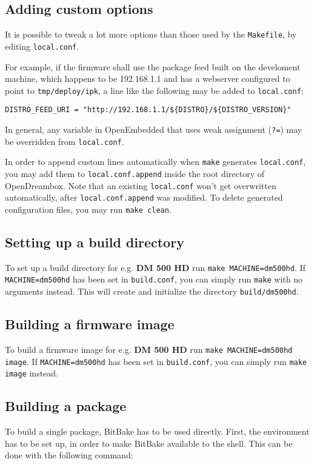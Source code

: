 \documentclass[a4paper]{article}
\newcommand{\shell}[1]{\texttt{\small #1}}
\begin{document}
  \subsection{Adding custom options}
     It is possible to tweak a lot more options than those used by the
     \shell{Makefile}, by editing \shell{local.conf}.

     For example, if the firmware shall use the package feed built on the develoment machine, which
     happens to be 192.168.1.1 and has a webserver configured to point to \shell{tmp/deploy/ipk},
     a line like the following may be added to \shell{local.conf}:

     \shell{DISTRO\_FEED\_URI = "http://192.168.1.1/\$\{DISTRO\}/\$\{DISTRO\_VERSION\}"}

     In general, any variable in OpenEmbedded that uses weak assignment (\shell{?=}) may be
     overridden from \shell{local.conf}.

     In order to append custom lines automatically when \shell{make} generates
     \shell{local.conf}, you may add them to \shell{local.conf.append}
     inside the root directory of OpenDreambox. Note that an existing \shell{local.conf}
     won't get overwritten automatically, after \shell{local.conf.append}
     was modified. To delete generated configuration files, you may run \shell{make clean}.

  \subsection{Setting up a build directory}
     To set up a build directory for e.g. \textbf{DM 500 HD} run \shell{make MACHINE=dm500hd}. If
     \shell{MACHINE=dm500hd} has been set in \shell{build.conf}, you can simply run \shell{make}
     with no arguments instead. This will create and initialize the directory \shell{build/dm500hd}.

  \subsection{Building a firmware image}
     To build a firmware image for e.g. \textbf{DM 500 HD} run \shell{make MACHINE=dm500hd image}.
     If \shell{MACHINE=dm500hd} has been set in \shell{build.conf}, you can simply run
     \shell{make image} instead.

  \subsection{Building a package}
     To build a single package, BitBake has to be used directly. First, the environment
     has to be set up, in order to make BitBake available to the shell. This can be done
     with the following command:
\end{document}
